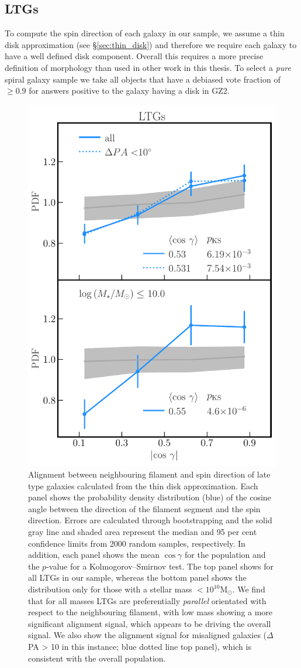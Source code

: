 \subsection{LTGs}
To compute the spin direction of each galaxy in our sample, we assume a thin disk approximation (see \S\ref{sec:thin_disk}) and therefore we require each galaxy to have a well defined disk component. Overall this requires a more precise definition of morphology than used in other work in this thesis. To select a \textit{pure} spiral galaxy sample we take all objects that have a debiased vote fraction of $\geq 0.9$ for answers positive to the galaxy having a disk in GZ2. 

\begin{figure}
    \centering
    \includegraphics[width=0.65\linewidth]{thesis/latex/cw_spin/spin_fil_LTGs_2in1.pdf}
    \caption{Alignment between neighbouring filament and spin direction of late type galaxies calculated from the thin disk approximation. Each panel shows the probability density distribution (blue) of the cosine angle between the direction of the filament segment and the spin direction. Errors are calculated through bootstrapping and the solid gray line and shaded area represent the median and 95 per cent confidence limits from 2000 random samples, respectively. In addition, each panel shows the mean $\cos \gamma$ for the population and the $p$-value for a Kolmogorov--Smirnov test. The top panel shows for all LTGs in our sample, whereas the bottom panel shows the distribution only for those with a stellar mass $\mathrm{< 10^{10} M_{\odot}}$. We find that for all masses LTGs are preferentially \textit{parallel} orientated with respect to the neighbouring filament, with low mass showing a more significant alignment signal, which appears to be driving the overall signal. We also show the alignment signal for misaligned galaxies ($\Delta$PA > 10 in this instance; blue dotted line top panel), which is consistent with the overall population.}
    \label{fig:ltgs_spin_alignment} 
\end{figure}


